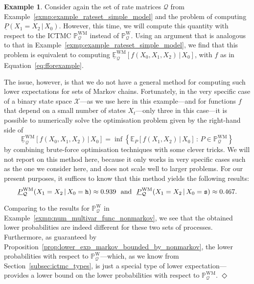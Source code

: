 \documentclass[10pt,a4paper]{paper}
\theoremstyle{definition}
\newtheorem{exmp}{Example}
\newcommand{\processes}{\mathbb{P}}
\newcommand{\wprocesses}{\processes^{\mathrm{W}}}
\newcommand{\wmprocesses}{\processes^{\mathrm{WM}}}
\newcommand{\rateset}{\mathcal{Q}}
\newcommand{\exampleend}{\hfill$\Diamond$}
\newcommand{\ictmc}{{ICTMC}}
\begin{document}
\begin{exmp} \label{exmp:num_counterexample_markov}
Consider again the set of rate matrices $\rateset$ from Example~\ref{exmp:example_rateset_simple_model} and the problem of computing $\underline{P}(X_1 = X_2\,\vert\, X_0)$. However, this time, we will compute this quantity with respect to the {\ictmc} $\wmprocesses_{\rateset}$ instead of $\wprocesses_{\rateset}$. Using an argument that is analogous to that in Example~\ref{exmp:example_rateset_simple_model}, we find that this problem is equivalent to computing $\underline{\mathbb{E}}_{\rateset}^{\mathrm{WM}}[f(X_0,X_1,X_2)\,\vert\,X_0]$, with $f$ as in Equation~\eqref{eq:fforexample}. 

The issue, however, is that we do not have a general method for computing such lower expectations for sets of Markov chains. Fortunately, in the very specific case of a binary state space $\mathcal{X}$---as we use here in this example---and for functions $f$ that depend on a small number of states $X_t$---only three in this case---it is possible to numerically solve the optimisation problem given by the right-hand side of
\begin{equation*}
\underline{\mathbb{E}}_{\rateset}^{\mathrm{WM}}[f(X_0,X_1,X_2)\,\vert\,X_0] = \inf\left\{ \mathbb{E}_P[f(X_1,X_2)\,\vert\,X_0]\,:\,P\in\wmprocesses_\rateset\right\}%
\end{equation*}
by combining brute-force optimisation techniques with some clever tricks. We will not report on this method here, because it only works in very specific cases such as the one we consider here, and does not scale well to larger problems. For our present purposes, it suffices to know that this method yields the following results:
\begin{align*}
\underline{P}_{\rateset}^{\mathrm{WM}}(X_1 = X_2\,\vert\,X_0=\text{{\tt h}}) \approx 0.939~~\text{and}~~\underline{P}_{\rateset}^{\mathrm{WM}}(X_1 = X_2\,\vert\,X_0=\text{{\tt s}}) \approx 0.467.
\end{align*}

Comparing to the results for $\wprocesses_\rateset$ in Example~\ref{exmp:num_multivar_func_nonmarkov}, we see that the obtained lower probabilities are indeed different for these two sets of processes. Furthermore, as guaranteed by Proposition~\ref{prop:lower_exp_markov_bounded_by_nonmarkov}, the lower probabilities with respect to $\wprocesses_\rateset$---which, as we know from Section~\ref{subsec:ictmc_types}, is just a special type of lower expectation---provides a lower bound on the lower probabilities with respect to $\wmprocesses_\rateset$.
\exampleend
\end{exmp}
\end{document}
